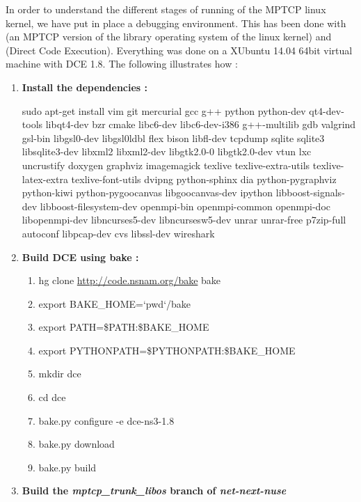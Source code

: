 \documentclass[a4paper,11pt]{article}
\begin{document}
		\label{sec:mptcpdebug}

		In order to understand the different stages of running of the MPTCP linux kernel, we have put in place a debugging environment. This has been done with \cite[LibOS]{libos} (an MPTCP version of the library operating system of the linux kernel) and \cite[DCE]{dce} (Direct Code Execution). Everything was done on a XUbuntu 14.04 64bit virtual machine with DCE 1.8. The following illustrates how :

		\begin{enumerate}
			\sloppy
			\item \textbf{Install the dependencies :}
				
			\nohyphens{
				sudo apt-get install vim git mercurial gcc g++ python python-dev qt4-dev-tools libqt4-dev bzr cmake libc6-dev libc6-dev-i386 g++-multilib gdb valgrind gsl-bin libgsl0-dev libgsl0ldbl flex bison libfl-dev tcpdump sqlite sqlite3 libsqlite3-dev libxml2 libxml2-dev libgtk2.0-0 libgtk2.0-dev vtun lxc uncrustify doxygen graphviz imagemagick texlive texlive-extra-utils texlive-latex-extra texlive-font-utils dvipng python-sphinx dia python-pygraphviz python-kiwi python-pygoocanvas libgoocanvas-dev ipython libboost-signals-dev libboost-filesystem-dev openmpi-bin openmpi-common openmpi-doc libopenmpi-dev libncurses5-dev libncursesw5-dev unrar unrar-free p7zip-full autoconf libpcap-dev cvs libssl-dev wireshark}

			\item \textbf{Build DCE using bake :}

				\begin{enumerate}

					\item hg clone \url{http://code.nsnam.org/bake} bake
					\item export BAKE\_HOME=`pwd`/bake
					\item export PATH=\$PATH:\$BAKE\_HOME
					\item export PYTHONPATH=\$PYTHONPATH:\$BAKE\_HOME
					\item mkdir dce
					\item cd dce
					\item bake.py configure -e dce-ns3-1.8
					\item bake.py download
					\item bake.py build

				\end{enumerate}

			\item \textbf{Build the \emph{mptcp\_trunk\_libos} branch of \emph{net-next-nuse}}
				\begin{enumerate}


\end{enumerate}
\end{enumerate}
\end{document}
